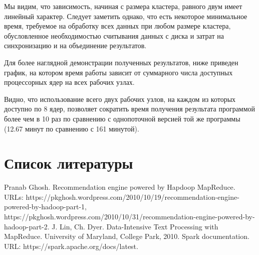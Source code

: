 \documentclass[12pt,a4paper]{report}
\begin{document}
Мы видим, что зависимость, начиная с размера кластера, равного двум имеет линейный характер. Следует заметить однако, что есть некоторое минимальное время, требуемое на обработку всех данных при любом размере кластера, обусловленное необходимостью считывания данных с диска и затрат на синхронизацию и на объединение результатов.

Для более наглядной демонстрации полученных результатов, ниже приведен график, на котором время работы зависит от суммарного числа доступных процессорных ядер на всех рабочих узлах.
\begin{figure}[H]
\centering
\end{figure}

Видно, что использование всего двух рабочих узлов, на каждом из которых доступно по 8 ядер, позволяет сократить время получения результата программой более чем в 10 раз по сравнению с однопоточной версией той же программы (12.67 минут по сравнению с 161 минутой).

\chapter*{Список литературы} 
\renewcommand{\chapter}[2]{}
\begin{thebibliography}{@@}
   Pranab Ghosh. Recommendation engine powered by Hapdoop MapReduce. URLs: https://pkghosh.wordpress.com/2010/10/19/recommendation-engine-powered-by-hadoop-part-1, https://pkghosh.wordpress.com/2010/10/31/recommendation-engine-powered-by-hadoop-part-2.
   J. Lin, Ch. Dyer. Data-Intensive Text Processing with MapReduce. University of Maryland, College Park, 2010.
   Spark documentation. URL: https://spark.apache.org/docs/latest. 
\end{thebibliography}
\end{document}
